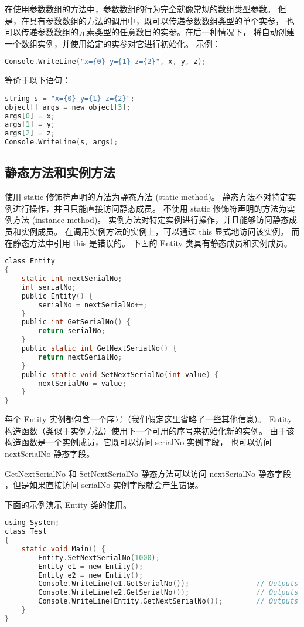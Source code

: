 在使用参数数组的方法中，参数数组的行为完全就像常规的数组类型参数。
但是，在具有参数数组的方法的调用中，既可以传递参数数组类型的单个实参，
也可以传递参数数组的元素类型的任意数目的实参。在后一种情况下，
将自动创建一个数组实例，并使用给定的实参对它进行初始化。
示例：

 \begin{lstlisting}[language=C] 
Console.WriteLine("x={0} y={1} z={2}", x, y, z);
 \end{lstlisting}

等价于以下语句：

 \begin{lstlisting}[language=C] 
string s = "x={0} y={1} z={2}";
object[] args = new object[3];
args[0] = x;
args[1] = y;
args[2] = z;
Console.WriteLine(s, args);
 \end{lstlisting}

\subsection{静态方法和实例方法}
使用 static 修饰符声明的方法为静态方法 (static method)。
静态方法不对特定实例进行操作，并且只能直接访问静态成员。
不使用 static 修饰符声明的方法为实例方法 (instance method)。
实例方法对特定实例进行操作，并且能够访问静态成员和实例成员。
在调用实例方法的实例上，可以通过 this 显式地访问该实例。
而在静态方法中引用 this 是错误的。
下面的 Entity 类具有静态成员和实例成员。

 \begin{lstlisting}[language=C] 
class Entity
{
    static int nextSerialNo;
    int serialNo;
    public Entity() {
        serialNo = nextSerialNo++;
    }
    public int GetSerialNo() {
        return serialNo;
    }
    public static int GetNextSerialNo() {
        return nextSerialNo;
    }
    public static void SetNextSerialNo(int value) {
        nextSerialNo = value;
    }
}
 \end{lstlisting}

每个 Entity 实例都包含一个序号（我们假定这里省略了一些其他信息）。
Entity 构造函数（类似于实例方法）使用下一个可用的序号来初始化新的实例。
由于该构造函数是一个实例成员，它既可以访问 serialNo 实例字段，
也可以访问 nextSerialNo 静态字段。

GetNextSerialNo 和 SetNextSerialNo 静态方法可以访问 nextSerialNo 静态字段
，但是如果直接访问 serialNo 实例字段就会产生错误。

下面的示例演示 Entity 类的使用。

 \begin{lstlisting}[language=C] 
using System;
class Test
{
    static void Main() {
        Entity.SetNextSerialNo(1000);
        Entity e1 = new Entity();
        Entity e2 = new Entity();
        Console.WriteLine(e1.GetSerialNo());                // Outputs "1000"
        Console.WriteLine(e2.GetSerialNo());                // Outputs "1001"
        Console.WriteLine(Entity.GetNextSerialNo());        // Outputs "1002"
    }
}
 \end{lstlisting}

